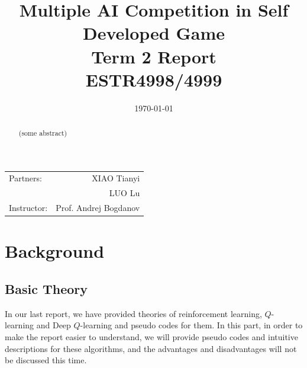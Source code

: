 \documentclass[12pt]{article}
\title{\large Multiple AI Competition in Self Developed Game \\ Term 2 Report \\ ESTR4998/4999} %
\date{\today} %
\begin{document}
\maketitle %

\begin{center}
\begin{tabular}{l r}
Partners: & XIAO Tianyi \\ %
& LUO Lu \\
Instructor: & Prof. Andrej Bogdanov %
\end{tabular}
\end{center}
\newpage



\begin{abstract}
	(some abstract)
\end{abstract}
 
\section{Background}

\subsection{Basic Theory}
In our last report, we have provided theories of reinforcement learning, $Q$-learning and Deep $Q$-learning and pseudo codes for them. In this part, in order to make the report easier to understand, we will provide pseudo codes and intuitive descriptions for these algorithms, and the advantages and disadvantages will not be discussed this time.
\end{document}
